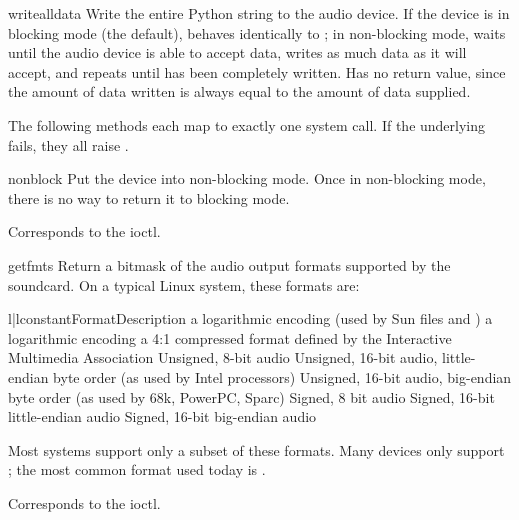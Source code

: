 \begin{methoddesc}{writeall}{data}
Write the entire Python string  to the audio device.  If the
device is in blocking mode (the default), behaves identically to
; in non-blocking mode,  waits until the
audio device is able to accept data, writes as much data as it will
accept, and repeats until  has been completely written.  Has
no return value, since the amount of data written is always equal to the
amount of data supplied.
\end{methoddesc}

The following methods each map to exactly one
 system call.  If the underlying 
fails, they all raise .

\begin{methoddesc}{nonblock}{}
Put the device into non-blocking mode.  Once in non-blocking mode, there
is no way to return it to blocking mode.

Corresponds to the  ioctl.
\end{methoddesc}

\begin{methoddesc}{getfmts}{}
Return a bitmask of the audio output formats supported by the
soundcard.  On a typical Linux system, these formats are:

\begin{tableii}{l|l}{constant}{Format}{Description}
       {a logarithmic encoding (used by Sun  files and
        )}
       {a logarithmic encoding}
       {a 4:1 compressed format defined by the Interactive Multimedia
        Association} 
       {Unsigned, 8-bit audio}
       {Unsigned, 16-bit audio, little-endian byte order (as used by
        Intel processors)}
       {Unsigned, 16-bit audio, big-endian byte order (as used by 68k,
        PowerPC, Sparc)}
       {Signed, 8 bit audio}
       {Signed, 16-bit little-endian audio}
       {Signed, 16-bit big-endian audio}
\end{tableii}
Most systems support only a subset of these formats.  Many devices only
support ; the most common format used today is
.

Corresponds to the  ioctl.
\end{methoddesc}

